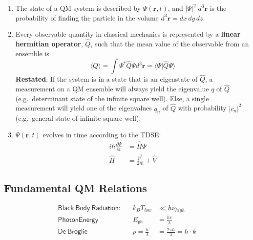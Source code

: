 \begin{enumerate}
    \item The state of a QM system is described by $\Psi(\mathbf{r},t)$, and $|\Psi|^2\; d^3 \mathbf{r}$ is the probability of finding the particle in the volume $d^3 \mathbf{r} = dx\,dy\,dz$.
    \item Every observable quantity in classical mechanics is represented by a \textbf{linear hermitian operator}, $\hat{Q}$, such that the mean value of the observable from an ensemble is
          \noindent\begin{equation*}
              \langle Q\rangle=\int\Psi^{*}\hat{Q}\Psi d^{3} \mathbf{r}= \langle\Psi|\hat{Q}\Psi\rangle
          \end{equation*}
          \textbf{Restated}:
          If the system is in a state that is an eigenstate of $\hat{Q}$, a measurement on a QM ensemble will always yield the eigenvalue $q$ of $\hat{Q}$ (e.g.\ determinant state of the infinite square well).\newline
          Else, a single measurement will yield one of the eigenvalues $q_n$ of $\hat{Q}$ with probability $|c_n|^2$ (e.g.\ general state of infinite square well).
    \item $\Psi(\mathbf{r},t)$ evolves in time according to the TDSE:
          \noindent\begin{align*}
              i\hbar \frac{\partial \Psi}{\partial t} & =\hat{H}\Psi                     \\
              \hat{H}                                 & = \frac{\hat{p}^2}{2m} + \hat{V}
          \end{align*}
\end{enumerate}

\subsection{Fundamental QM Relations}

\noindent\begin{align*}
    \mathsf{Black\ Body\ Radiation}: &  & k_B T_{low}         & \ll h\nu_{high}                         \\
    \mathsf{Photon Energy}           &  & E_{\mathsf{ph}}     & = \frac{hc}{\lambda}                    \\
    \mathsf{De\ Broglie}             &  & p=\frac{h}{\lambda} & =\frac{2\pi\hbar}{\lambda}=\hbar\cdot k
\end{align*}


